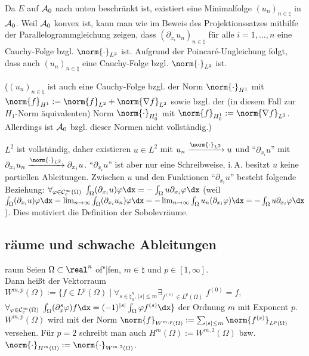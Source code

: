 \begin{Bem}
    Da $E$ auf $\mathcal{A}_0$ nach unten beschränkt ist, existiert eine Minimalfolge
    $(u_n)_{n \in \natural}$ in $\mathcal{A}_0$.
    Weil $\mathcal{A}_0$ konvex ist, kann man wie im Beweis des Projektionssatzes mithilfe der
    Parallelogrammgleichung zeigen, dass $(\partial_{x_i} u_n)_{n \in \natural}$ für alle
    $i = 1, \dotsc, n$ eine Cauchy-Folge bzgl. $\norm{\cdot}_{L^2}$ ist.
    Aufgrund der Poincaré-Ungleichung folgt, dass auch $(u_n)_{n \in \natural}$ eine
    Cauchy-Folge bzgl. $\norm{\cdot}_{L^2}$ ist.

    ($(u_n)_{n \in \natural}$ ist auch eine Cauchy-Folge bzgl. der Norm $\norm{\cdot}_{H^1}$
    mit $\norm{f}_{H^1} := \norm{f}_{L^2} + \norm{\nabla f}_{L^2}$
    sowie bzgl. der (in diesem Fall zur $H_1$-Norm äquivalenten) Norm $\norm{\cdot}_{H^1_0}$
    mit $\norm{f}_{H^1_0} := \norm{\nabla f}_{L^2}$.
    Allerdings ist $\mathcal{A}_0$ bzgl. dieser Normen nicht vollständig.)

    $L^2$ ist vollständig,
    daher existieren $u \in L^2$ mit $u_n \xrightarrow{\norm{\cdot}_{L^2}} u$ und
    "`$\partial_{x_i} u$"' mit $\partial_{x_i} u_n \xrightarrow{\norm{\cdot}_{L^2}}
    \partial_{x_i} u$.
    "`$\partial_{x_i} u$"' ist aber nur eine Schreibweise, i.\,A. besitzt $u$ keine partiellen
    Ableitungen.
    Zwischen $u$ und den Funktionen "`$\partial_{x_i} u$"' besteht folgende Beziehung:
    $\forall_{\varphi \in \C^\infty_c(\Omega)}\;
    \int_\Omega (\partial_{x_i} u) \varphi \dx = -\int_\Omega u \partial_{x_i} \varphi \dx$
    (weil $\int_\Omega (\partial_{x_i} u) \varphi \dx
    = \lim_{n \to \infty} \int_\Omega (\partial_{x_i} u_n) \varphi \dx
    = -\lim_{n \to \infty} \int_\Omega u_n (\partial_{x_i} \varphi) \dx
    = -\int_\Omega u \partial_{x_i} \varphi \dx$).
    Dies motiviert die Definition der Sobolevräume.
\end{Bem}

\subsection{%
    räume und schwache Ableitungen%
}

\begin{Def}{raum}
    Seien $\Omega \subset \real^n$ of"|fen, $m \in \natural$ und $p \in [1, \infty]$.\\
    Dann heißt der Vektorraum
    $W^{m,p}(\Omega) := \{f \in L^p(\Omega) \;|\; \forall_{s \in \natural_0^n,\, |s| \le m}
    \exists_{f^{(s)} \in L^p(\Omega)}\; f^{(0)} = f,$\\
    $\forall_{\varphi \in \C^\infty_c(\Omega)}\;
    \int_\Omega (\partial_x^s \varphi) f \dx = (-1)^{|s|} \int_\Omega \varphi f^{(s)} \dx\}$
     der Ordnung $m$ mit Exponent $p$.\\
    $W^{m,p}(\Omega)$ wird mit der Norm
    $\norm{f}_{W^{m,p}(\Omega)} := \sum_{|s| \le m} \norm{f^{(s)}}_{L^p(\Omega)}$ versehen.
    Für $p = 2$ schreibt man auch $H^m(\Omega) := W^{m,2}(\Omega)$ bzw.
    $\norm{\cdot}_{H^m(\Omega)} := \norm{\cdot}_{W^{m,2}(\Omega)}$.
\end{Def}

